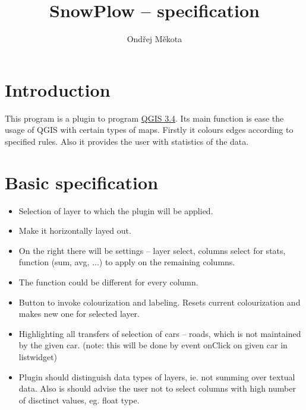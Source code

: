 \documentclass[12pt,a4paper]{article}
\begin{document}
\title{SnowPlow – specification}
\author{Ondřej Měkota}

\maketitle
\pagebreak
\section{Introduction}

\par This program is a plugin to program \href{https://qgis.org/en/site/index.html}{QGIS 3.4}. 
Its main function is ease the usage of QGIS with certain types of maps.
Firstly it colours edges according to specified rules.
Also it provides the user with statistics of the data.


\section{Basic specification}
\begin{itemize}
    \item Selection of layer to which the plugin will be applied.
    \item Make it horizontally layed out.
    \item On the right there will be settings – layer select, columns select for stats, function (sum, avg, ...) to apply on the remaining columns.
    \item The function could be different for every column.
    \item Button to invoke colourization and labeling. Resets current colourization and makes new one for selected layer.
    \item Highlighting all transfers of selection of cars – roads, which is not maintained by the given car. (note: this will be done by event onClick on given car in listwidget)
    \item Plugin should distinguish data types of layers, ie. not summing over textual data. Also is should advise the user not to select columns with high number of disctinct values, eg. float type.

\end{itemize}
\end{document}
